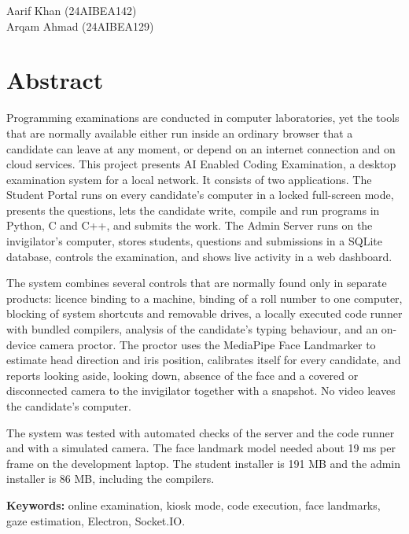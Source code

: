 \documentclass[12pt,a4paper]{report}
\newcommand{\ProjectTitle}{AI Enabled Coding Examination}
\newcommand{\frontchapter}[1]{\chapter*{#1}\addcontentsline{toc}{chapter}{#1}}
\begin{document}
\vspace{1.2cm}
\begin{flushright}
Aarif Khan (24AIBEA142)\\
Arqam Ahmad (24AIBEA129)
\end{flushright}
\clearpage

\frontchapter{Abstract}
Programming examinations are conducted in computer laboratories, yet the tools that are normally available either run inside an ordinary browser that a candidate can leave at any moment, or depend on an internet connection and on cloud services. This project presents \ProjectTitle, a desktop examination system for a local network. It consists of two applications. The Student Portal runs on every candidate's computer in a locked full-screen mode, presents the questions, lets the candidate write, compile and run programs in Python, C and C++, and submits the work. The Admin Server runs on the invigilator's computer, stores students, questions and submissions in a SQLite database, controls the examination, and shows live activity in a web dashboard.

The system combines several controls that are normally found only in separate products: licence binding to a machine, binding of a roll number to one computer, blocking of system shortcuts and removable drives, a locally executed code runner with bundled compilers, analysis of the candidate's typing behaviour, and an on-device camera proctor. The proctor uses the MediaPipe Face Landmarker to estimate head direction and iris position, calibrates itself for every candidate, and reports looking aside, looking down, absence of the face and a covered or disconnected camera to the invigilator together with a snapshot. No video leaves the candidate's computer.

The system was tested with automated checks of the server and the code runner and with a simulated camera. The face landmark model needed about 19 ms per frame on the development laptop. The student installer is 191 MB and the admin installer is 86 MB, including the compilers.

\vspace{0.4cm}
\noindent\textbf{Keywords:} online examination, kiosk mode, code execution, face landmarks, gaze estimation, Electron, Socket.IO.
\clearpage

\begingroup
\singlespacing
\tableofcontents
\clearpage
{}
\listoffigures
\clearpage
{}
\listoftables
\clearpage
\endgroup
\end{document}
